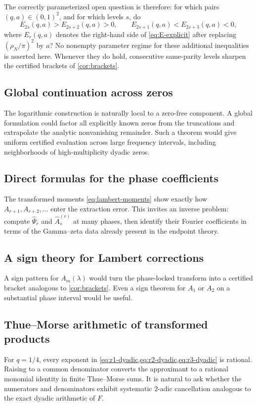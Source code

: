 \documentclass[11pt]{article}
\theoremstyle{definition}
\theoremstyle{remark}
\begin{document}
The correctly parameterized open question is therefore: for which pairs
$(q,a)\in(0,1)^2$, and for which levels $s$, do
\[
 E_{2s}(q,a)>E_{2s+2}(q,a)>0,
 \qquad
 E_{2s+1}(q,a)<E_{2s+3}(q,a)<0,
\]
where $E_r(q,a)$ denotes the right-hand side of \eqref{eq:E-explicit} after replacing
$(\rho_N/\pi)^2$ by $a$?  No nonempty parameter regime for these additional inequalities
is asserted here.  Whenever they do hold, consecutive same-parity levels sharpen the
certified brackets of \cref{cor:brackets}.

\subsection{Global continuation across zeros}

The logarithmic construction is naturally local to a zero-free component. A global formulation could factor all explicitly known zeros from the truncations and extrapolate the analytic nonvanishing remainder. Such a theorem would give uniform certified evaluation across large frequency intervals, including neighborhoods of high-multiplicity dyadic zeros.

\subsection{Direct formulas for the phase coefficients}

The transformed moments \cref{eq:lambert-moments} show exactly how $A_{r+1},A_{r+2},\ldots$ enter the extraction error. This invites an inverse problem: compute $\widehat\Psi_r$ and $\widehat A_s^{(r)}$ at many phases, then identify their Fourier coefficients in terms of the Gamma--zeta data already present in the endpoint theory.

\subsection{A sign theory for Lambert corrections}

A sign pattern for $A_m(\lambda)$ would turn the phase-locked transform into a certified bracket analogous to \cref{cor:brackets}. Even a sign theorem for $A_1$ or $A_2$ on a substantial phase interval would be useful.

\subsection{Thue--Morse arithmetic of transformed products}

For $q=1/4$, every exponent in \cref{eq:r1-dyadic,eq:r2-dyadic,eq:r3-dyadic} is rational. Raising to a common denominator converts the approximant to a rational monomial identity in finite Thue--Morse sums. It is natural to ask whether the numerators and denominators exhibit systematic $2$-adic cancellation analogous to the exact dyadic arithmetic of $F$.
\end{document}
